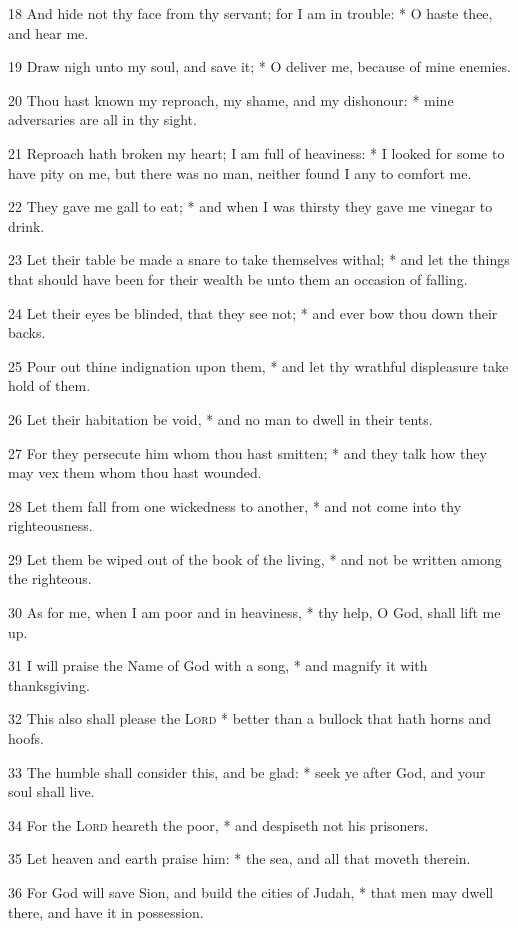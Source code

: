 18 And hide not thy face from thy servant; for I am in trouble: * O haste thee, and hear me.\par
19 Draw nigh unto my soul, and save it; * O deliver me, because of mine enemies.\par
20 Thou hast known my reproach, my shame, and my dishonour: * mine adversaries are all in thy sight.\par
21 Reproach hath broken my heart; I am full of heaviness: * I looked for some to have pity on me, but there was no man, neither found I any to comfort me.\par
22 They gave me gall to eat; * and when I was thirsty they gave me vinegar to drink.\par
23 Let their table be made a snare to take themselves withal; * and let the things that should have been for their wealth be unto them an occasion of falling.\par
24 Let their eyes be blinded, that they see not; * and ever bow thou down their backs.\par
25 Pour out thine indignation upon them, * and let thy wrathful displeasure take hold of them.\par
26 Let their habitation be void, * and no man to dwell in their tents.\par
27 For they persecute him whom thou hast smitten; * and they talk how they may vex them whom thou hast wounded.\par
28 Let them fall from one wickedness to another, * and not come into thy righteousness.\par
29 Let them be wiped out of the book of the living, * and not be written among the righteous.\par
30 As for me, when I am poor and in heaviness, * thy help, O God, shall lift me up.\par
31 I will praise the Name of God with a song, * and magnify it with thanksgiving.\par
32 This also shall please the {\textsc{Lord}} * better than a bullock that hath horns and hoofs.\par
33 The humble shall consider this, and be glad: * seek ye after God, and your soul shall live.\par
34 For the {\textsc{Lord}} heareth the poor, * and despiseth not his prisoners.\par
35 Let heaven and earth praise him: * the sea, and all that moveth therein.\par
36 For God will save Sion, and build the cities of Judah, * that men may dwell there, and have it in possession.\par
